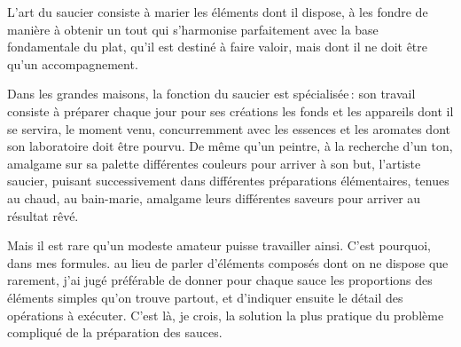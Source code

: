 L'art du saucier consiste à marier les éléments dont il dispose, à les fondre
de manière à obtenir un tout qui s’harmonise parfaitement avec la base
fondamentale du plat, qu'il est destiné à faire valoir, mais dont il ne doit
être qu'un accompagnement.

Dans les grandes maisons, la fonction du saucier est spécialisée : son travail
consiste à préparer chaque jour pour ses créations les fonds et les appareils
dont il se servira, le moment venu, concurremment avec les essences et les
aromates dont son laboratoire doit être pourvu. De même qu'un peintre, à la
recherche d'un ton, amalgame sur sa palette différentes couleurs pour arriver
à son but, l'artiste saucier, puisant successivement dans différentes
préparations élémentaires, tenues au chaud, au bain-marie, amalgame leurs
différentes saveurs pour arriver au résultat rêvé.

Mais il est rare qu'un modeste amateur puisse travailler ainsi. C’est pourquoi,
dans mes formules. au lieu de parler d'éléments composés dont on ne dispose que
rarement, j'ai jugé préférable de donner pour chaque sauce les proportions des
éléments simples qu'on trouve partout, et d'indiquer ensuite le détail des
opérations à exécuter. C'est là, je crois, la solution la plus pratique du
problème compliqué de la préparation des sauces.
